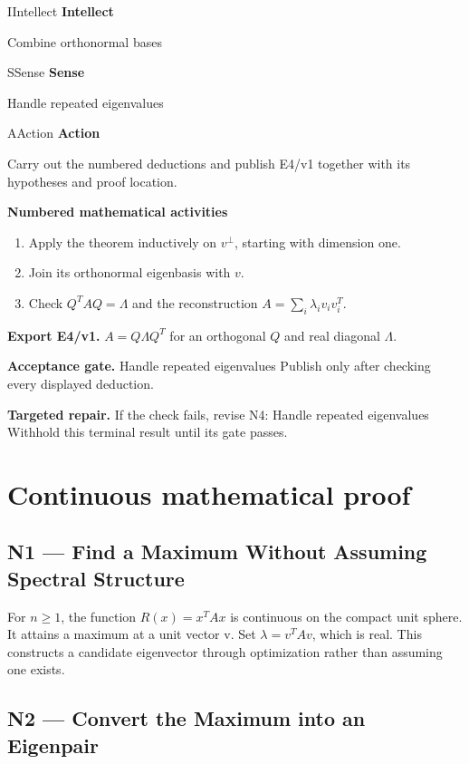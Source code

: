 \documentclass[preprint,12pt,aps,pra,showkeys,amsmath,amssymb,superscriptaddress,floatfix]{revtex4-2}
\theoremstyle{definition}
\theoremstyle{remark}
\newcommand{\mmfaculty}[3]{%
 \begin{mmfacultybox}{#1}{#2}
 {\sffamily\bfseries\color{MMBlue}#2}\par\smallskip #3
 \end{mmfacultybox}}
\newcommand{\field}[2]{\par\smallskip\noindent\textbf{#1.} #2\par}
\begin{document}
\mmfaculty{I}{Intellect}{Combine orthonormal bases}

\mmfaculty{S}{Sense}{Handle repeated eigenvalues}

\mmfaculty{A}{Action}{Carry out the numbered deductions and publish E4/v1 together with its
hypotheses and proof location.}

\smallskip\noindent\textbf{Numbered mathematical activities}

\begin{enumerate}[label=N4.\arabic*,leftmargin=3.4em]

\item Apply the theorem inductively on \(v^\perp\), starting with dimension
one.

\item Join its orthonormal eigenbasis with \(v\).

\item Check \(Q^TAQ=\Lambda\) and the reconstruction
\(A=\sum_i\lambda_i v_iv_i^T\).

\end{enumerate}

\field{Export E4/v1}{\(A=Q\Lambda Q^T\) for an orthogonal \(Q\) and real diagonal
\(\Lambda\).}

\field{Acceptance gate}{Handle repeated eigenvalues Publish only after checking every displayed
deduction.}

\field{Targeted repair}{If the check fails, revise N4: Handle repeated eigenvalues Withhold this
terminal result until its gate passes.}

\endgroup\clearpage\section{Continuous mathematical proof}\label{sec:proof}

\subsection{N1 --- Find a Maximum Without Assuming Spectral
Structure}\label{n1-find-a-maximum-without-assuming-spectral-structure}

For \(n\ge 1\), the function \(R(x)=x^TAx\) is continuous on the compact
unit sphere. It attains a maximum at a unit vector v. Set
\(\lambda =v^{T}Av\), which is real. This constructs a candidate
eigenvector through optimization rather than assuming one exists.

\subsection{N2 --- Convert the Maximum into an
Eigenpair}\label{n2-convert-the-maximum-into-an-eigenpair}
\end{document}
